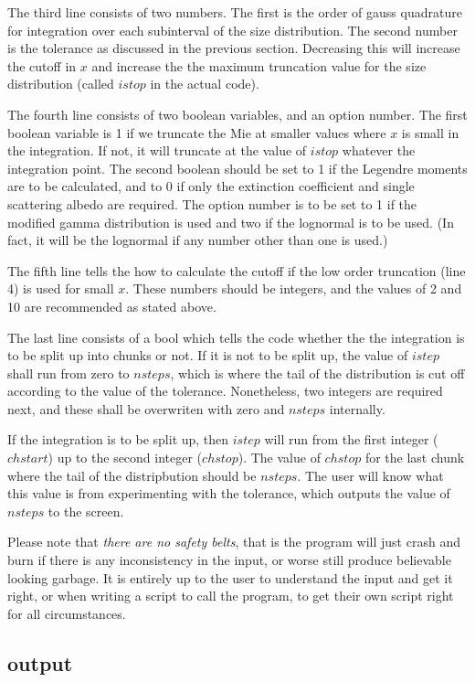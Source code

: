 \begin{flushleft}
The third line consists of two numbers. The first is the order of gauss quadrature
for integration over each subinterval of the size distribution. The second
 number is the tolerance as 
discussed in the previous section. Decreasing this will increase the cutoff in $x$
and increase the the maximum truncation value for the size distribution (called $istop$
in the actual code).
 

The fourth line consists of two boolean variables, and an option number.
 The first  boolean variable is 1 if
we truncate the Mie at smaller values where  $x$ is small in the integration.
If not, it will truncate at the value of $istop$ whatever the integration point.
The second boolean should be set to 1 if the Legendre moments are to be calculated,
and to 0 if only the extinction coefficient and single scattering albedo are required.
The option number is to be set to 1 if the modified gamma distribution is used
and two if the lognormal is to be used. (In fact, it will be the lognormal if
any number other than one is used.)

The fifth line tells the  how to calculate the cutoff if
the low order truncation (line 4) is used for small $x$. These numbers should be 
integers, and the values of 2 and 10 are recommended as stated above.

The last line consists of a bool which tells the code whether the the integration
is to be split up into chunks or not. If it is not to be split up, the value
of $istep$ shall run from zero to $nsteps$, which is where the tail of the distribution
is cut off according to the value of the tolerance. Nonetheless, two integers are
required next, and these shall be overwriten with zero and $nsteps$ internally.

If the integration is to be split up, then $istep$ will run from the first integer
($chstart$) up to the second integer ($chstop$). The value of $chstop$ for the
last chunk where the tail of the distripbution should be $nsteps$. The user will
know what this value is from experimenting with the tolerance, which outputs
the value of $nsteps$ to the screen.

Please note that {\it there are no safety belts}, that is the program will just
crash and burn if there is any inconsistency in the input, or worse still produce
believable looking garbage. It is entirely up to the user to understand the input 
and get it right, or when writing a script to call the program, to get their own script
right for all circumstances.

\subsection{output}


\end{flushleft}
